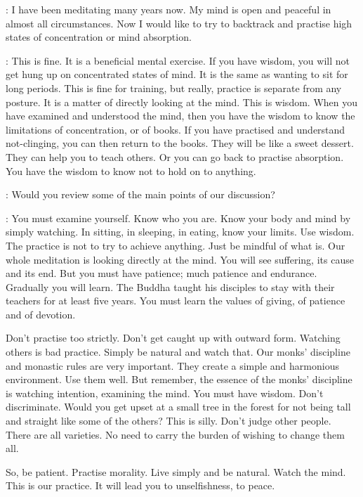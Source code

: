 :
I have been meditating many years now. My mind is open and peaceful in almost all circumstances. Now I would like to try to backtrack and practise high states of concentration or mind absorption. 

: This is fine. It is a beneficial mental exercise. If you have wisdom, you will not get hung up on concentrated states of mind. It is the same as wanting to sit for long periods. This is fine for training, but really, practice is separate from any posture. It is a matter of directly looking at the mind. This is wisdom. When you have examined and understood the mind, then you have the wisdom to know the limitations of concentration, or of books. If you have practised and understand not-clinging, you can then return to the books. They will be like a sweet dessert. They can help you to teach others. Or you can go back to practise absorption. You have the wisdom to know not to hold on to anything. 

:
Would you review some of the main points of our discussion? 

: You must examine yourself. Know who you are. Know your body and mind by simply watching. In sitting, in sleeping, in eating, know your limits. Use wisdom. The practice is not to try to achieve anything. Just be mindful of what is. Our whole meditation is looking directly at the mind. You will see suffering, its cause and its end. But you must have patience; much patience and endurance. Gradually you will learn. The Buddha taught his disciples to stay with their teachers for at least five years. You must learn the values of giving, of patience and of devotion. 

Don't practise too strictly. Don't get caught up with outward form. Watching others is bad practice. Simply be natural and watch that. Our monks' discipline and monastic rules are very important. They create a simple and harmonious environment. Use them well. But remember, the essence of the monks' discipline is watching intention, examining the mind. You must have wisdom. Don't discriminate. Would you get upset at a small tree in the forest for not being tall and straight like some of the others? This is silly. Don't judge other people. There are all varieties. No need to carry the burden of wishing to change them all. 

So, be patient. Practise morality. Live simply and be natural. Watch the mind. This is our practice. It will lead you to unselfishness, to peace.
